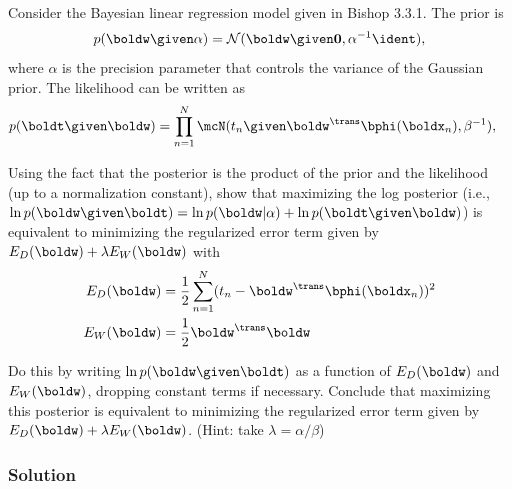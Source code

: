 \documentclass[submit]{harvardml}
\begin{document}
\newpage
\begin{problem}
Consider the Bayesian linear regression model given in Bishop 3.3.1. The prior is
\begin{align*}
p(\boldw \given \alpha) = \mathcal{N}(\boldw \given \bold0, \alpha^{-1}\ident ),
\end{align*}
where $\alpha$ is the precision parameter that controls the variance of the Gaussian prior.  The likelihood can be written as
\begin{align*}
p(\boldt \given \boldw) &= \prod_{n=1}^N \mcN(t_n \given \boldw^\trans \bphi(\boldx_n), \beta^{-1}),
\end{align*}

Using the fact that the posterior is the product of the prior and the likelihood (up to a normalization constant), show that maximizing the log posterior (i.e., $\ln p(\boldw \given \boldt)= \ln p(\boldw | \alpha) + \ln p(\boldt \given \boldw)$) is equivalent to minimizing the regularized error term given by ${E_D(\boldw) + \lambda E_W(\boldw)}$ with 
\begin{align*}
E_D(\boldw) &= \frac{1}{2}\sum_{n = 1}^N (t_n - \boldw^\trans \bphi(\boldx_n))^2 \\
E_W(\boldw) &= \frac{1}{2}\boldw^\trans \boldw
\end{align*} 

Do this by writing $\ln p(\boldw \given \boldt)$ as a function of $E_D(\boldw)$ and $E_W(\boldw)$, dropping constant terms if necessary.  Conclude that maximizing this posterior is equivalent to minimizing the regularized error term given by $E_D(\boldw) + \lambda E_W(\boldw)$. (Hint: take $\lambda = \alpha/\beta$)
\end{problem}


\subsubsection*{Solution}
\end{document}
